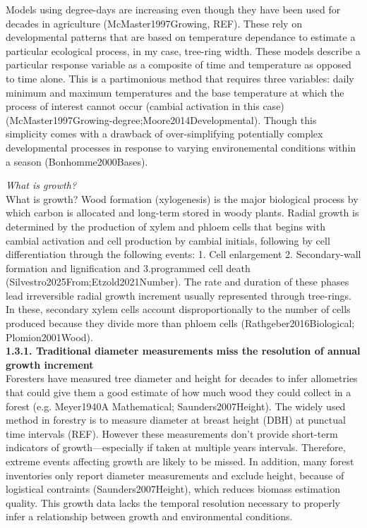 \documentclass{article}
\begin{document}
Models using degree-days are increasing even though they have been used for decades in agriculture (McMaster1997Growing, REF). These rely on developmental patterns that are based on temperature dependance to estimate a particular ecological process, in my case, tree-ring width. These models describe a particular response variable as a composite of time and temperature as opposed to time alone. This is a partimonious method that requires three variables: daily minimum and maximum temperatures and the base temperature at which the process of interest cannot occur (cambial activation in this case) (McMaster1997Growing-degree;Moore2014Developmental).  Though this simplicity comes with a drawback of over-simplifying potentially complex developmental processes in response to varying environemental conditions within a season (Bonhomme2000Bases).

\textit{What is growth?} \\ 
What is growth? Wood formation (xylogenesis) is the major biological process by which carbon is allocated and long-term stored in woody plants. Radial growth is determined by the production of xylem and phloem cells that begins with cambial activation and cell production by cambial initials, following by cell differentiation through the following events: 1. Cell enlargement 2. Secondary-wall formation and lignification and 3.programmed cell death (Silvestro2025From;Etzold2021Number). The rate and duration of these phases lead irreversible radial growth increment usually represented through tree-rings. In these, secondary xylem cells account disproportionally to the number of cells produced because they divide more than phloem cells (Rathgeber2016Biological; Plomion2001Wood). \\

\textbf{1.3.1. Traditional diameter measurements miss the resolution of annual growth increment} \\
Foresters have measured tree diameter and height for decades to infer allometries that could give them a good estimate of how much wood they could collect in a forest (e.g. Meyer1940A Mathematical; Saunders2007Height). The widely used method in forestry is to measure diameter at breast height (DBH) at punctual time intervals (REF). However these measurements don't provide short-term indicators of growth---especially if taken at multiple years intervals. Therefore, extreme events affecting growth are likely to be missed. In addition, many forest inventories only report diameter measurements and exclude height, because of logistical contraints (Saunders2007Height), which reduces biomass estimation quality. This growth data lacks the temporal resolution necessary to properly infer a relationship between growth and environmental conditions. 
\end{document}
